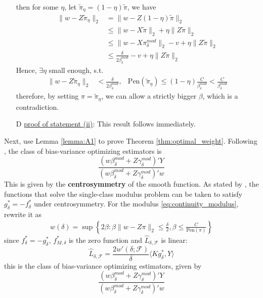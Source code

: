 \documentclass{article}
\begin{document}
\begin{itemize}
  then for some $\eta$, let $\tilde{\pi}_{\eta}=(1-\eta)\tilde{\pi}$, we have
  \begin{align*}
    \lVert w-Z\tilde{\pi}_{\eta} \rVert_2 & = \lVert w- Z(1-\eta)\tilde{\pi} \rVert_2\\
    & \leq \lVert w-X\tilde{\pi} \rVert_2 + \eta\lVert Z\tilde{\pi} \rVert_2 \\
    &\leq \lVert w -X\pi_{\delta}^{mod} \rVert_2 -v +\eta \lVert Z\tilde{\pi}\rVert_2\\
    &\leq \frac{\delta}{2\beta_{\delta}^{mod}}-v+\eta \lVert Z\tilde{\pi} \rVert_2
  \end{align*}
  Hence, $\exists \eta$ small enough, s.t.
  \begin{align*}
    \lVert w-Z\tilde{\pi}_{\eta} \rVert_2 & < \frac{\delta}{2\beta^{mod}_{\delta}}, &\mathrm{Pen}(\tilde{\pi}_{\eta})\leq (1-\eta)\frac{C}{\beta_{\delta}^{mod}}< \frac{C}{\beta_{\delta}^{mod}}
  \end{align*}
   therefore, by setting $\pi=\tilde{\pi}_{\eta}$, we can allow a strictly bigger $\beta$, which is a contradiction.
  \item[D] \underline{proof of statement (ii)}: This result follows immediately.
\end{itemize}

Next, use Lemma \ref{lemma:A1} to prove Theorem \ref{thm:optimal_weight}. Following \citet{armstrong2018optimal}, the class of bias-variance optimizing estimators is 
$$
\frac{\left(w \beta^{mod}_{\delta}+Z\gamma^{mod}_{\delta}\right)'Y}{\left(w \beta^{mod}_{\delta}+Z\gamma^{mod}_{\delta}\right)'w}
$$
This is given by the \textbf{centrosymmetry} of the smooth function. As stated by \citet{armstrong2018optimal}, the functions that solve the single-class modulus problem can be taken to satisfy $g^*_{\delta}= -f^*_{\delta}$ under centrosymmetry. For the modulus \ref{eq:continuity_modulus}, rewrite it as
\begin{align*}
  w(\delta) = \sup\left\{ 2\beta: \beta\lVert w-Z\pi \rVert_2 \leq \frac{\delta}{2}, \beta\leq \frac{C}{\mathrm{Pen}(\pi)} \right\}
\end{align*}
since $f^*_{\delta}=-g^*_{\delta}$, $f^*_{M,\delta}$ is the zero function and $\hat{L}_{\delta,\mathcal{F}}$ is linear:
$$
\hat{L}_{\delta,\mathcal{F}} = \frac{2w'(\delta;\mathcal{F})}{\delta} \langle Kg_{\delta}^*,Y \rangle
$$
this is the class of bias-variance optimizing estimators, given by 
$$
\frac{\left(w\beta_{\delta}^{mod}+Z\gamma_{\delta}^{mod}\right) 'Y}{\left(w\beta_{\delta}^{mod}+Z\gamma_{\delta}^{mod}\right) 'w}
$$

\newpage


\end{document}
